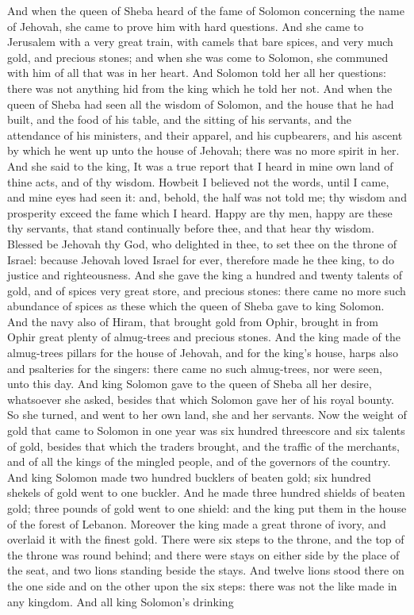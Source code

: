 And when the queen of Sheba heard of the fame of Solomon concerning the name of Jehovah, she came to prove him with hard questions. And she came to Jerusalem with a very great train, with camels that bare spices, and very much gold, and precious stones; and when she was come to Solomon, she communed with him of all that was in her heart. And Solomon told her all her questions: there was not anything hid from the king which he told her not. And when the queen of Sheba had seen all the wisdom of Solomon, and the house that he had built, and the food of his table, and the sitting of his servants, and the attendance of his ministers, and their apparel, and his cupbearers, and his ascent by which he went up unto the house of Jehovah; there was no more spirit in her. And she said to the king, It was a true report that I heard in mine own land of thine acts, and of thy wisdom. Howbeit I believed not the words, until I came, and mine eyes had seen it: and, behold, the half was not told me; thy wisdom and prosperity exceed the fame which I heard. Happy are thy men, happy are these thy servants, that stand continually before thee, and that hear thy wisdom. Blessed be Jehovah thy God, who delighted in thee, to set thee on the throne of Israel: because Jehovah loved Israel for ever, therefore made he thee king, to do justice and righteousness. And she gave the king a hundred and twenty talents of gold, and of spices very great store, and precious stones: there came no more such abundance of spices as these which the queen of Sheba gave to king Solomon.  And the navy also of Hiram, that brought gold from Ophir, brought in from Ophir great plenty of almug-trees and precious stones. And the king made of the almug-trees pillars for the house of Jehovah, and for the king’s house, harps also and psalteries for the singers: there came no such almug-trees, nor were seen, unto this day.  And king Solomon gave to the queen of Sheba all her desire, whatsoever she asked, besides that which Solomon gave her of his royal bounty. So she turned, and went to her own land, she and her servants.  Now the weight of gold that came to Solomon in one year was six hundred threescore and six talents of gold, besides that which the traders brought, and the traffic of the merchants, and of all the kings of the mingled people, and of the governors of the country. And king Solomon made two hundred bucklers of beaten gold; six hundred shekels of gold went to one buckler. And he made three hundred shields of beaten gold; three pounds of gold went to one shield: and the king put them in the house of the forest of Lebanon. Moreover the king made a great throne of ivory, and overlaid it with the finest gold. There were six steps to the throne, and the top of the throne was round behind; and there were stays on either side by the place of the seat, and two lions standing beside the stays. And twelve lions stood there on the one side and on the other upon the six steps: there was not the like made in any kingdom. And all king Solomon’s drinking 